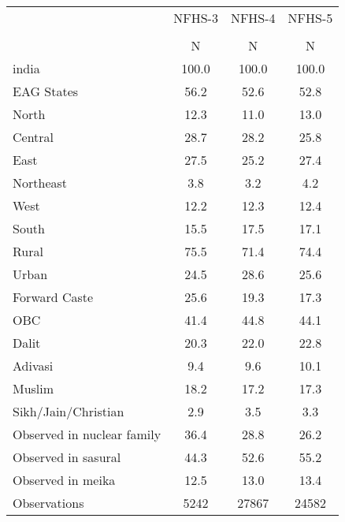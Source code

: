 {
\def\sym#1{\ifmmode^{#1}\else\(^{#1}\)\fi}
\begin{tabular}{l*{3}{c}}
\toprule
                    &      NFHS-3&      NFHS-4&      NFHS-5\\
                    &\multicolumn{1}{c}{}&\multicolumn{1}{c}{}&\multicolumn{1}{c}{}\\
                    &           N&           N&           N\\
\midrule
india               &       100.0&       100.0&       100.0\\
EAG States          &        56.2&        52.6&        52.8\\
North               &        12.3&        11.0&        13.0\\
Central             &        28.7&        28.2&        25.8\\
East                &        27.5&        25.2&        27.4\\
Northeast           &         3.8&         3.2&         4.2\\
West                &        12.2&        12.3&        12.4\\
South               &        15.5&        17.5&        17.1\\
Rural               &        75.5&        71.4&        74.4\\
Urban               &        24.5&        28.6&        25.6\\
Forward Caste       &        25.6&        19.3&        17.3\\
OBC                 &        41.4&        44.8&        44.1\\
Dalit               &        20.3&        22.0&        22.8\\
Adivasi             &         9.4&         9.6&        10.1\\
Muslim              &        18.2&        17.2&        17.3\\
Sikh/Jain/Christian &         2.9&         3.5&         3.3\\
Observed in nuclear family&        36.4&        28.8&        26.2\\
Observed in sasural &        44.3&        52.6&        55.2\\
Observed in meika   &        12.5&        13.0&        13.4\\
\midrule
Observations        &        5242&       27867&       24582\\
\bottomrule
\end{tabular}
}
